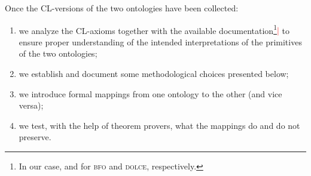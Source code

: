 \documentclass[ao]{iosart2x}
\newcommand{\nb}[1]{\textcolor{red}{$|$}\marginpar{\hspace*{-0cm}\parbox{20mm}{\scriptsize\raggedright\textcolor{red}{#1}}}}
\newcommand{\dolce}{{\textsc{dolce}}}
\newcommand{\bfo}{{\textsc{bfo}}}
\begin{document}
Once the CL-versions of the two ontologies have been collected: %
%
\begin{enumerate}
\item we analyze the CL-axioms together with the available documentation\footnote{In our case, \cite{barryBasicFormalOntology2015} and \cite{D18} for {\bfo} and {\dolce}, respectively.}\nb{CM: citare alemeno il documento di bfo che abbiamo considerato [FC: vedi se ti va bene la nota, non so a quale documento di BFO tu hai fatto riferimento]} to ensure proper understanding of the intended interpretations of the primitives of the two ontologies;
 \item we establish and document some methodological choices presented below;
\item we introduce formal mappings from one ontology to the other (and vice versa);
\item we test, with the help of theorem provers, what the mappings do and do not preserve.
\end{enumerate}
\end{document}
